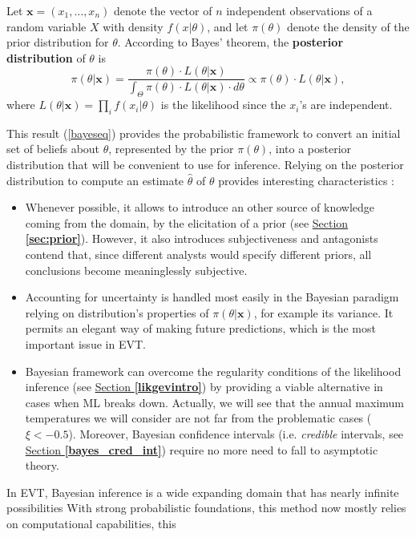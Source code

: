 \begin{definition}
	Let $\boldsymbol{x}=(x_1,\dots,x_n)$
	denote the vector of $n$ independent observations of a random variable $X$ with density $f(x|\theta)$, and let $\pi(\theta)$ denote the density of the prior distribution for $\theta$. According to Bayes' theorem, the \textbf{posterior distribution} of $\theta$ is 
	\begin{equation}\label{bayeseq}
	\pi (\theta|\boldsymbol{x})=\frac{\pi(\theta)\cdot L(\theta|\boldsymbol{x})}{\int_{\Theta} 
		\pi(\theta)\cdot L(\theta|\boldsymbol{x}) \cdot d\theta}\propto \pi(\theta)\cdot 
	L(\theta|\boldsymbol{x}),
	\end{equation}
	where $L(\theta|\boldsymbol{x})=\prod_i f(x_i|\theta)$ is the likelihood since the $x_i$'s are independent.
\end{definition}
This result (\ref{bayeseq}) provides the probabilistic framework to convert an initial set of beliefs about $\theta$, represented by the prior $\pi(\theta)$, into a posterior distribution that will be convenient to use for inference.
Relying on the posterior distribution to compute an estimate $\hat{\theta}$ of $\theta$ provides interesting characteristics :
\begin{itemize}
	\item Whenever possible, it allows to introduce an other source of knowledge coming from the domain, by the elicitation of a prior (see \hyperref[sec:prior]{Section \textbf{\ref{sec:prior}}}). However, it also introduces subjectiveness and antagonists contend that, since different analysts would specify
	different priors, all conclusions become meaninglessly subjective.
	
	\item\label{it2bayes} Accounting for  uncertainty is handled most easily in the
	Bayesian paradigm relying on distribution's properties of $\pi(\theta|\boldsymbol{x})$, for example its variance. %
	 It permits an elegant way of making future predictions, which is the most important issue in EVT.
	
	\item Bayesian framework can overcome the regularity conditions of the likelihood inference
	(see \hyperref[likgevintro]{Section \textbf{\ref{likgevintro}}}) by providing a viable alternative in cases when ML breaks down. Actually, we will see that the annual maximum temperatures we will consider are not far from the problematic cases ($\xi<-0.5$). 
	Moreover, Bayesian confidence intervals (i.e. \emph{credible} intervals, see \hyperref[bayes_cred_int]{Section \textbf{\ref{bayes_cred_int}}}) require no more need to fall to asymptotic theory.
\end{itemize}
In EVT, Bayesian inference is a wide expanding domain that has nearly infinite possibilities 
With strong probabilistic foundations, this method now mostly relies on computational capabilities, this 


